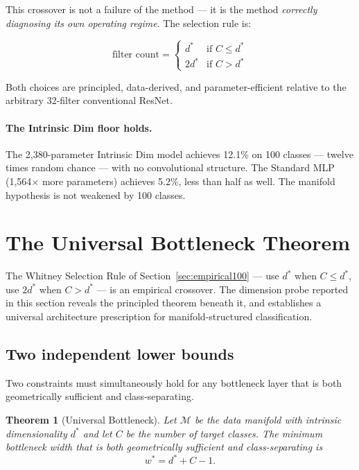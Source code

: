 \documentclass[11pt,letterpaper]{article}
\newtheorem{theorem}{Theorem}[section]
\begin{document}
This crossover is not a failure of the method — it is the method
\emph{correctly diagnosing its own operating regime}.  The selection
rule is:

\begin{equation}
  \text{filter count} = \begin{cases}
    d^* & \text{if } C \leq d^* \\
    2d^* & \text{if } C > d^*
  \end{cases}
\end{equation}

Both choices are principled, data-derived, and parameter-efficient
relative to the arbitrary 32-filter conventional ResNet.

\paragraph{The Intrinsic Dim floor holds.}
The 2{,}380-parameter Intrinsic Dim model achieves 12.1\% on 100 classes
— twelve times random chance — with no convolutional structure.  The
Standard MLP (1{,}564$\times$ more parameters) achieves 5.2\%, less than
half as well.  The manifold hypothesis is not weakened by 100 classes.

\section{The Universal Bottleneck Theorem}
\label{sec:universal_bottleneck}

The Whitney Selection Rule of Section~\ref{sec:empirical100} —
use $d^*$ when $C \leq d^*$, use $2d^*$ when $C > d^*$ — is an empirical
crossover.  The dimension probe reported in this section reveals the
principled theorem beneath it, and establishes a universal architecture
prescription for manifold-structured classification.

\subsection{Two independent lower bounds}

Two constraints must simultaneously hold for any bottleneck layer that is
both geometrically sufficient and class-separating.

\begin{theorem}[Universal Bottleneck]
\label{thm:universal}
Let $\mathcal{M}$ be the data manifold with intrinsic dimensionality $d^*$
and let $C$ be the number of target classes.  The minimum bottleneck width
that is both geometrically sufficient and class-separating is
\begin{equation}
  w^* = d^* + C - 1.
\end{equation}
\end{theorem}
\end{document}
